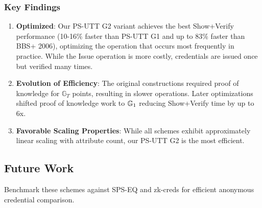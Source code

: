 \subsubsection{Key Findings}
\begin{enumerate}
    \item \textbf{Optimized}: Our PS-UTT G2 variant achieves the best Show+Verify performance (10-16\% faster than PS-UTT G1 and up to 83\% faster than BBS+ 2006), optimizing the operation that occurs most frequently in practice. While the Issue operation is more costly, credentials are issued once but verified many times.
    
    \item \textbf{Evolution of Efficiency}: The original constructions \cite{hutchison_constant-size_2006, sako_short_2016} required proof of knowledge for $\mathbb{G}_T$ points, resulting in slower operations. Later optimizations \cite{camenisch_anonymous_2016, tomescu_utt_2022} shifted proof of knowledge work to $\mathbb{G}_1$ reducing Show+Verify time by up to 6x. 
    
    \item \textbf{Favorable Scaling Properties}: While all schemes exhibit approximately linear scaling with attribute count, our PS-UTT G2 is the most efficient.
\end{enumerate}




\subsection{Future Work}
Benchmark these schemes against SPS-EQ and zk-creds for efficient anonymous credential comparison.



































